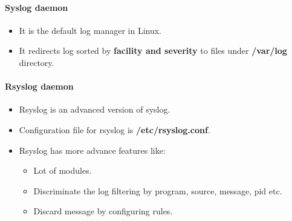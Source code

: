 \setlength{\columnsep}{3pt}
\begin{flushleft}
\bigskip
\bigskip

\paragraph{Syslog daemon}
\begin{itemize}
	\item It is the default log manager in Linux.
	\item It redirects log sorted by \textbf{facility and severity} to files under \textbf{/var/log} directory.
	
\end{itemize}

\paragraph{Rsyslog daemon}
\begin{itemize}
	\item Rsyslog is an advanced version of syslog.
	\item Configuration file for rsyslog is \textbf{/etc/rsyslog.conf}.
	\item Rsyslog has more advance features like:
	\begin{itemize}
		\item Lot of modules.
		\item Discriminate the log filtering by program, source, message, pid etc.
		\item Discard message by configuring rules.
	\end{itemize}	
\end{itemize}

\end{flushleft}
\newpage


